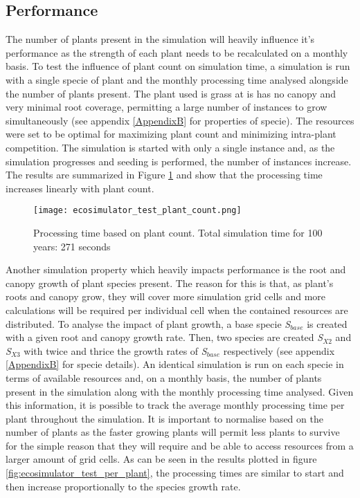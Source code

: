 \subsection{Performance} \label{subsec:ecosytem_performance}

The number of plants present in the simulation will heavily influence it's performance as the strength of each plant needs to be recalculated on a monthly basis. To test the influence of plant count on simulation time, a simulation is run with a single specie of plant and the monthly processing time analysed alongside the number of plants present. The plant used is grass at is has no canopy and very minimal root coverage, permitting a large number of instances to grow simultaneously (see appendix \ref{AppendixB} for properties of specie). The resources were set to be optimal for maximizing plant count and minimizing intra-plant competition. The simulation is started with only a single instance and, as the simulation progresses and seeding is performed, the number of instances increase. The results are summarized in Figure \ref{fig:ecosimulator_test_plant_count} and show that the processing time increases linearly with plant count. \\

\begin{figure}
\center
	\texttt{[image: ecosimulator\_test\_plant\_count.png]}
	\caption{ Processing time based on plant count. Total simulation time for 100 years: 271 seconds}	
	\label{fig:ecosimulator_test_plant_count}
\end{figure}

Another simulation property which heavily impacts performance is the root and canopy growth of plant species present. The reason for this is that, as plant's roots and canopy grow, they will cover more simulation grid cells and more calculations will be required per individual cell when the contained resources are distributed. To analyse the impact of plant growth, a base specie \textit{S$_{base}$} is created with a given root and canopy growth rate. Then, two species are created \textit{S$_{X2}$} and \textit{S$_{X3}$} with twice and thrice the growth rates of \textit{S$_{base}$} respectively (see appendix \ref{AppendixB} for specie details). An identical simulation is run on each specie in terms of available resources and, on a monthly basis, the number of plants present in the simulation along with the monthly processing time analysed. Given this information, it is possible to track the average monthly processing time per plant throughout the simulation. It is important to normalise based on the number of plants as the faster growing plants will permit less plants to survive for the simple reason that they will require and be able to access resources from a larger amount of grid cells. As can be seen in the results plotted in figure \ref{fig:ecosimulator_test_per_plant}, the processing times are similar to start and then increase proportionally to the species growth rate.


